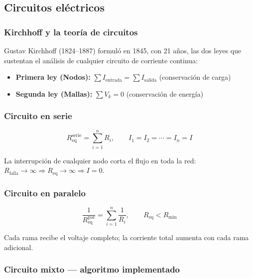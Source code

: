 \documentclass[12pt, a4paper]{article}
\newcommand{\Req}{R_{\mathrm{eq}}}
\begin{document}
\subsection{Circuitos eléctricos}

\subsubsection{Kirchhoff y la teoría de circuitos}

Gustav Kirchhoff (1824--1887) formuló en 1845, con 21 años, las dos leyes
que sustentan el análisis de cualquier circuito de corriente continua:

\begin{itemize}
  \item \textbf{Primera ley (Nodos):} $\sum I_{\mathrm{entrada}} = \sum I_{\mathrm{salida}}$ \quad (conservación de carga)
  \item \textbf{Segunda ley (Mallas):} $\sum V_k = 0$ \quad (conservación de energía)
\end{itemize}

\subsubsection{Circuito en serie}

\begin{equation}
  \Req^{\mathrm{serie}} = \sum_{i=1}^{n} R_i, \qquad
  I_1 = I_2 = \cdots = I_n = I
  \label{eq:serie}
\end{equation}

La interrupción de cualquier nodo corta el flujo en toda la red:
$R_{\mathrm{falla}} \to \infty \Rightarrow \Req \to \infty \Rightarrow I = 0$.

\subsubsection{Circuito en paralelo}

\begin{equation}
  \frac{1}{\Req^{\mathrm{par}}} = \sum_{i=1}^{n} \frac{1}{R_i}, \qquad
  \Req < R_{\min}
  \label{eq:paralelo}
\end{equation}

Cada rama recibe el voltaje completo; la corriente total aumenta con cada
rama adicional.

\subsubsection{Circuito mixto --- algoritmo implementado}
\end{document}
